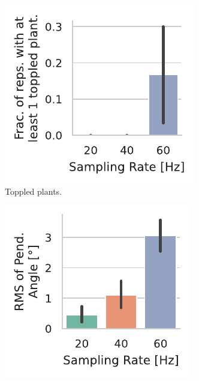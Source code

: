 \begin{figure}[t]
    \centering
    \begin{subfigure}[h]{.45\textwidth}
        \centering
        \includegraphics[width=\textwidth]{publications/2022CLEAVE/plots/fixed_video_topple_frac}
        \caption{Toppled plants.}\label{paper:olguinmunoz2022cleave:fig:video:toppled}
    \end{subfigure}%
    \hfill%
    \begin{subfigure}[h]{.45\textwidth}
        \centering
        \includegraphics[width=\textwidth]{publications/2022CLEAVE/plots/fixed_video_angle_rms}

\end{subfigure}
\end{figure}
